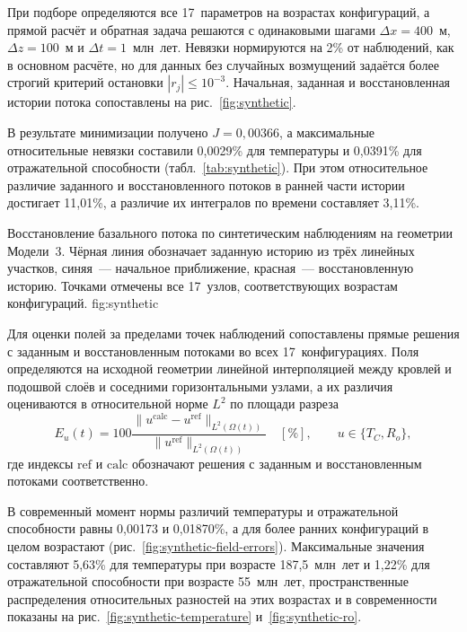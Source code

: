 При подборе определяются все 17~параметров на возрастах конфигураций, а прямой расчёт и обратная задача решаются с одинаковыми шагами $\Delta x=400$~м, $\Delta z=100$~м и $\Delta t=1$~млн~лет. Невязки нормируются на 2\% от наблюдений, как в основном расчёте, но для данных без случайных возмущений задаётся более строгий критерий остановки $|r_j|\leq10^{-3}$. Начальная, заданная и восстановленная истории потока сопоставлены на рис.~\ref{fig:synthetic}.

В результате минимизации получено $J=0{,}00366$, а максимальные относительные невязки составили 0,0029\% для температуры и 0,0391\% для отражательной способности (табл.~\ref{tab:synthetic}). При этом относительное различие заданного и восстановленного потоков в ранней части истории достигает 11,01\%, а различие их интегралов по времени составляет 3,11\%.

 {Восстановление базального потока по синтетическим наблюдениям на геометрии Модели~3. Чёрная линия обозначает заданную историю из трёх линейных участков, синяя~--- начальное приближение, красная~--- восстановленную историю. Точками отмечены все 17~узлов, соответствующих возрастам конфигураций.} {fig:synthetic}


Для оценки полей за пределами точек наблюдений сопоставлены прямые решения с заданным и восстановленным потоками во всех 17~конфигурациях. Поля определяются на исходной геометрии линейной интерполяцией между кровлей и подошвой слоёв и соседними горизонтальными узлами, а их различия оцениваются в относительной норме $L^2$ по площади разреза
\begin{equation}
 E_u(t) = 100\frac{\|u^{\mathrm{calc}} - u^{\mathrm{ref}}\|_{L^2(\Omega(t))}}
                    {\|u^{\mathrm{ref}}\|_{L^2(\Omega(t))}}\quad[\%],
 \qquad u \in \{T_C,R_o\},
 \label{eq:field-error}
\end{equation}
где индексы $\mathrm{ref}$ и $\mathrm{calc}$ обозначают решения с заданным и восстановленным потоками соответственно.

В современный момент нормы различий температуры и отражательной способности равны 0,00173 и 0,01870\%, а для более ранних конфигураций в целом возрастают (рис.~\ref{fig:synthetic-field-errors}). Максимальные значения составляют 5,63\% для температуры при возрасте 187,5~млн~лет и 1,22\% для отражательной способности при возрасте 55~млн~лет, пространственные распределения относительных разностей на этих возрастах и в современности показаны на рис.~\ref{fig:synthetic-temperature} и~\ref{fig:synthetic-ro}.

